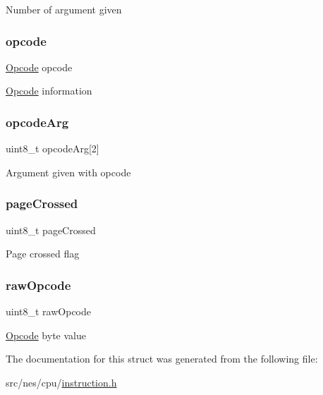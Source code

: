 Number of argument given \mbox{\label{struct_instruction_a4ee0311d643454fcf8d4f707fba72a6d}} 
\subsubsection{\texorpdfstring{opcode}{opcode}}
{\footnotesize\ttfamily \hyperlink{struct_opcode}{Opcode} opcode}

\hyperlink{struct_opcode}{Opcode} information \mbox{\label{struct_instruction_a59180d12e1d75e81d606a437f3abb293}} 
\subsubsection{\texorpdfstring{opcode\+Arg}{opcodeArg}}
{\footnotesize\ttfamily uint8\+\_\+t opcode\+Arg\mbox{[}2\mbox{]}}

Argument given with opcode \mbox{\label{struct_instruction_a6d48ff193a5218fe9f4089254160f19c}} 
\subsubsection{\texorpdfstring{page\+Crossed}{pageCrossed}}
{\footnotesize\ttfamily uint8\+\_\+t page\+Crossed}

Page crossed flag \mbox{\label{struct_instruction_a62e2f27f9942405e7def81df4c2b664f}} 
\subsubsection{\texorpdfstring{raw\+Opcode}{rawOpcode}}
{\footnotesize\ttfamily uint8\+\_\+t raw\+Opcode}

\hyperlink{struct_opcode}{Opcode} byte value 

The documentation for this struct was generated from the following file\+:\begin{DoxyCompactItemize}
\item 
src/nes/cpu/\hyperlink{instruction_8h}{instruction.\+h}\end{DoxyCompactItemize}
